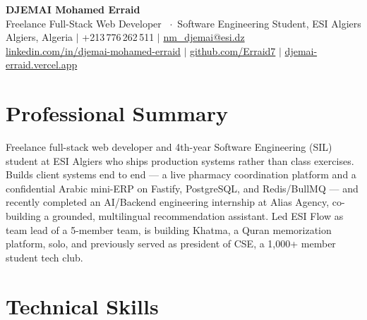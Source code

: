 \documentclass[10pt, a4paper]{article}
\begin{document}

\begin{center}
  {\LARGE\bfseries\color{accent} DJEMAI Mohamed Erraid}\\[4pt]
  {\large\color{textsecondary} Freelance Full-Stack Web Developer \ $\cdot$\ Software Engineering Student, ESI Algiers}\\[6pt]
  \small
  \textcolor{textsecondary}{
    Algiers, Algeria
    \quad$|$\quad
    +213\,776\,262\,511
    \quad$|$\quad
    \href{mailto:nm_djemai@esi.dz}{nm\_djemai@esi.dz}
  }\\[2pt]
  \small
  \href{https://www.linkedin.com/in/djemai-mohamed-erraid-3835862b8}{linkedin.com/in/djemai-mohamed-erraid}
  \quad$|$\quad
  \href{https://github.com/Erraid7}{github.com/Erraid7}
  \quad$|$\quad
  \href{https://djemai-erraid.vercel.app}{djemai-erraid.vercel.app}
\end{center}

\vspace{2pt}

\section{Professional Summary}

Freelance full-stack web developer and 4th-year Software Engineering (SIL) student at ESI Algiers who ships production systems rather than class exercises. Builds client systems end to end --- a live pharmacy coordination platform and a confidential Arabic mini-ERP on Fastify, PostgreSQL, and Redis/BullMQ --- and recently completed an AI/Backend engineering internship at Alias Agency, co-building a grounded, multilingual recommendation assistant. Led ESI Flow as team lead of a 5-member team, is building Khatma, a Quran memorization platform, solo, and previously served as president of CSE, a 1,000+ member student tech club.

\section{Technical Skills}
\end{document}
